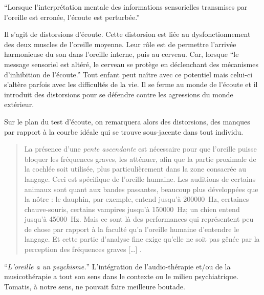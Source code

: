 \enquote{Lorsque l'interprétation mentale des informations sensorielles
trans\-mi\-ses par l'oreille est erronée, l'écoute est perturbée.}\autocite{tomatis.com}

Il s'agit de distorsions d'écoute. Cette distorsion est liée au dysfonctionnement
des deux muscles de l'oreille moyenne. Leur rôle est de permettre l'arrivée
harmonieuse du son dans l'oreille interne, puis au cerveau. Car, lorsque
\enquote{le message sensoriel est altéré, le cerveau se protège en déclenchant
des mécanismes d'inhibition de l'écoute.} Tout enfant peut naître
avec ce potentiel mais celui-ci s'altère parfois avec les difficultés
de la vie. Il se ferme au monde de l'écoute et il introduit des distorsions
pour se défendre contre les agressions du monde extérieur. 

Sur le plan du test d'écoute, on remarquera
alors des distorsions, des manques par rapport à la courbe
idéale qui se trouve sous-jacente dans tout individu. 

\blockquote{La présence d'une \emph{pente ascendante} est nécessaire pour que
l'oreille puisse bloquer les fréquences graves, les atténuer, afin
que la partie proximale de la cochlée soit utilisée, plus particulièrement
dans la zone consacrée au langage. Ceci est spécifique de l'oreille
humaine. Les auditions de certains animaux sont quant aux bandes passantes,
beaucoup plus développées que la nôtre : le dauphin, par exemple,
entend jusqu'à \SI{200000}{\Hz}, certaines chauve-souris,
certains vampires jusqu'à \SI{150000}{\Hz}; un chien entend jusqu'à \SI{45000}{\Hz}. Mais ce sont là des performances qui représentent peu de chose
par rapport à la faculté qu'a l'oreille humaine d'entendre
le langage. Et cette partie d'analyse fine exige qu'elle ne soit pas
gênée par la perception des fréquences graves [\dots] \autocite{Entretien de Tomatis par Auriol}. }

\enquote{\emph{L'oreille a un psychisme\autocite[correct? p.?]{tomatis:loreille}.}} 
L'intégration de l'audio-thérapie et/ou de la musicothérapie a tout son sens dans le contexte ou le milieu psychiatrique. Tomatis, à notre sens, ne pouvait faire meilleure boutade.

